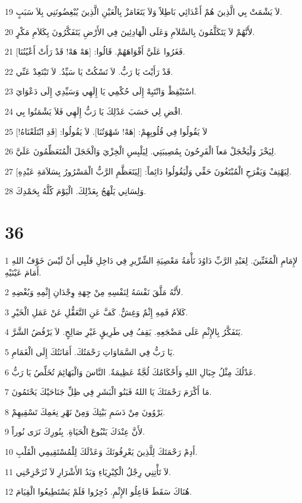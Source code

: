 \par 19 لاَ يَشْمَتْ بِي الَّذِينَ هُمْ أَعْدَائِي بَاطِلاً وَلاَ يَتَغَامَزْ بِالْعَيْنِ الَّذِينَ يُبْغِضُونَنِي بِلاَ سَبَبٍ.
\par 20 لأَنَّهُمْ لاَ يَتَكَلَّمُونَ بِالسَّلاَمِ وَعَلَى الْهَادِئِينَ فِي الأَرْضِ يَتَفَكَّرُونَ بِكَلاَمِ مَكْرٍ.
\par 21 فَغَرُوا عَلَيَّ أَفْوَاهَهُمْ. قَالُوا: [هَهْ هَهْ! قَدْ رَأَتْ أَعْيُنُنَا].
\par 22 قَدْ رَأَيْتَ يَا رَبُّ. لاَ تَسْكُتْ يَا سَيِّدُ. لاَ تَبْتَعِدْ عَنِّي.
\par 23 اسْتَيْقِظْ وَانْتَبِهْ إِلَى حُكْمِي يَا إِلَهِي وَسَيِّدِي إِلَى دَعْوَايَ.
\par 24 اقْضِ لِي حَسَبَ عَدْلِكَ يَا رَبُّ إِلَهِي فَلاَ يَشْمَتُوا بِي.
\par 25 لاَ يَقُولُوا فِي قُلُوبِهِمْ: [هَهْ! شَهْوَتُنَا]. لاَ يَقُولُوا: [قَدِ ابْتَلَعْنَاهُ!]
\par 26 لِيَخْزَ وَلْيَخْجَلْ مَعاً الْفَرِحُونَ بِمُصِيبَتِي. لِيَلْبِسِ الْخِزْيَ وَالْخَجَلَ الْمُتَعَظِّمُونَ عَلَيَّ.
\par 27 لِيَهْتِفْ وَيَفْرَحِ الْمُبْتَغُونَ حَقِّي وَلْيَقُولُوا دَائِماً: [لِيَتَعَظَّمِ الرَّبُّ الْمَسْرُورُ بِسَلاَمَةِ عَبْدِهِ].
\par 28 وَلِسَانِي يَلْهَجُ بِعَدْلِكَ. الْيَوْمَ كُلَّهُ بِحَمْدِكَ.

\chapter{36}

\par 1 لإِمَامِ الْمُغَنِّينَ. لِعَبْدِ الرَّبِّ دَاوُدَ نَأْمَةُ مَعْصِيَةِ الشِّرِّيرِ فِي دَاخِلِ قَلْبِي أَنْ لَيْسَ خَوْفُ اللهِ أَمَامَ عَيْنَيْهِ.
\par 2 لأَنَّهُ مَلَّقَ نَفْسَهُ لِنَفْسِهِ مِنْ جِهَةِ وِجْدَانِ إِثْمِهِ وَبُغْضِهِ.
\par 3 كَلاَمُ فَمِهِ إِثْمٌ وَغِشٌّ. كَفَّ عَنِ التَّعَقُّلِ عَنْ عَمَلِ الْخَيْرِ.
\par 4 يَتَفَكَّرُ بِالإِثْمِ عَلَى مَضْجَعِهِ. يَقِفُ فِي طَرِيقٍ غَيْرِ صَالِحٍ. لاَ يَرْفُضُ الشَّرَّ.
\par 5 يَا رَبُّ فِي السَّمَاوَاتِ رَحْمَتُكَ. أَمَانَتُكَ إِلَى الْغَمَامِ.
\par 6 عَدْلُكَ مِثْلُ جِبَالِ اللهِ وَأَحْكَامُكَ لُجَّةٌ عَظِيمَةٌ. النَّاسَ وَالْبَهَائِمَ تُخَلِّصُ يَا رَبُّ.
\par 7 مَا أَكْرَمَ رَحْمَتَكَ يَا اللهُ فَبَنُو الْبَشَرِ فِي ظِلِّ جَنَاحَيْكَ يَحْتَمُونَ.
\par 8 يَرْوُونَ مِنْ دَسَمِ بَيْتِكَ وَمِنْ نَهْرِ نِعَمِكَ تَسْقِيهِمْ.
\par 9 لأَنَّ عِنْدَكَ يَنْبُوعَ الْحَيَاةِ. بِنُورِكَ نَرَى نُوراً.
\par 10 أَدِمْ رَحْمَتَكَ لِلَّذِينَ يَعْرِفُونَكَ وَعَدْلَكَ لِلْمُسْتَقِيمِي الْقَلْبِ.
\par 11 لاَ تَأْتِنِي رِجْلُ الْكِبْرِيَاءِ وَيَدُ الأَشْرَارِ لاَ تُزَحْزِحْنِي.
\par 12 هُنَاكَ سَقَطَ فَاعِلُو الإِثْمِ. دُحِرُوا فَلَمْ يَسْتَطِيعُوا الْقِيَامَ.

